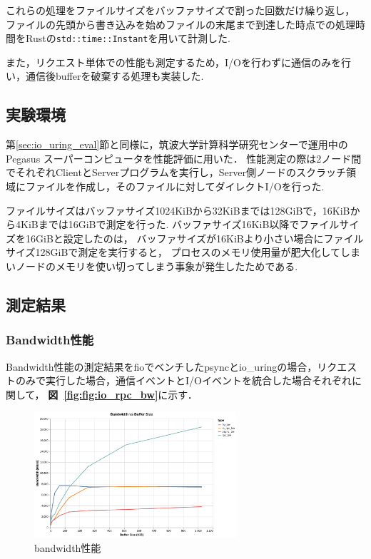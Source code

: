 \documentclass[a4paper,11pt]{jreport}
\newcommand\figref[1]{\textbf{図~\ref{fig:#1}}}
\begin{document}
これらの処理をファイルサイズをバッファサイズで割った回数だけ繰り返し，
ファイルの先頭から書き込みを始めファイルの末尾まで到達した時点での処理時間をRustの\lstinline|std::time::Instant|を用いて計測した.

また，リクエスト単体での性能も測定するため，I/Oを行わずに通信のみを行い，通信後bufferを破棄する処理も実装した.

\subsection{実験環境}
第\ref{sec:io_uring_eval}節と同様に，筑波大学計算科学研究センターで運用中のPegasus スーパーコンピュータを性能評価に用いた．
性能測定の際は2ノード間でそれぞれClientとServerプログラムを実行し，Server側ノードのスクラッチ領域にファイルを作成し，そのファイルに対してダイレクトI/Oを行った.

ファイルサイズはバッファサイズ1024KiBから32KiBまでは128GiBで，16KiBから4KiBまでは16GiBで測定を行った.
バッファサイズ16KiB以降でファイルサイズを16GiBと設定したのは，
バッファサイズが16KiBより小さい場合にファイルサイズ128GiBで測定を実行すると，
プロセスのメモリ使用量が肥大化してしまいノードのメモリを使い切ってしまう事象が発生したためである.

\subsection{測定結果}\label{sec:io_rpc_result}
\subsubsection{Bandwidth性能}
Bandwidth性能の測定結果をfioでベンチしたpsyncとio\_uringの場合，リクエストのみで実行した場合，通信イベントとI/Oイベントを統合した場合それぞれに関して，
\figref{fig:io_rpc_bw}に示す．

\begin{figure}[tb]
	\centering
	\includegraphics[width=7.5cm, bb=0 0 700 450]{figures/bw_linear_plot.pdf}
	\caption{bandwidth性能}
	\label{fig:io_rpc_bw}
\end{figure}
\end{document}
